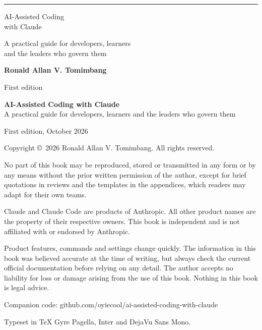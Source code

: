 \thispagestyle{empty}
\begin{center}
\vspace*{38mm}
{\color{accent}\rule{28mm}{2pt}}\par\vspace{14mm}
{\displayfont\fontsize{36}{42}\selectfont\color{ink} AI-Assisted Coding\\[4pt] with Claude\par}
\vspace{12mm}
{\sffamily\Large\color{muted} A practical guide for developers, learners\\ and the leaders who govern them\par}
\vfill
{\sffamily\large\bfseries\color{ink} Ronald Allan V. Tomimbang\par}
\vspace{4mm}
{\sffamily\small\color{muted} First edition\par}
\vspace*{18mm}
\end{center}
\clearpage
\thispagestyle{empty}
\vspace*{\fill}
{\small\sffamily\color{muted}
\textbf{\color{ink}AI-Assisted Coding with Claude}\\
A practical guide for developers, learners and the leaders who govern them

First edition, October 2026

Copyright \copyright\ 2026 Ronald Allan V. Tomimbang. All rights reserved.

No part of this book may be reproduced, stored or transmitted in any form or by any means without the prior written permission of the author, except for brief quotations in reviews and the templates in the appendices, which readers may adapt for their own teams.

Claude and Claude Code are products of Anthropic. All other product names are the property of their respective owners. This book is independent and is not affiliated with or endorsed by Anthropic.

Product features, commands and settings change quickly. The information in this book was believed accurate at the time of writing, but always check the current official documentation before relying on any detail. The author accepts no liability for loss or damage arising from the use of this book. Nothing in this book is legal advice.

Companion code: github.com/oyiecool/ai-assisted-coding-with-claude

Typeset in TeX Gyre Pagella, Inter and DejaVu Sans Mono.\par}
\clearpage
